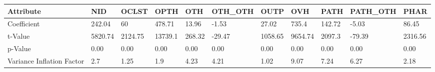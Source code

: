 \begin{tabular}{lllllllllll}
\toprule
Attribute &      NID &    OCLST &     OPTH &     OTH & OTH\_OTH &     OUTP &      OVH &    PATH & PATH\_OTH &     PHAR \\
\midrule
Coefficient               &   242.04 &       60 &   478.71 &   13.96 &   -1.53 &    27.02 &    735.4 &  142.72 &    -5.03 &    86.45 \\
t-Value                   &  5820.74 &  2124.75 &  13739.1 &  268.32 &  -29.47 &  1058.65 &  9654.74 &  2097.3 &   -79.39 &  2316.56 \\
p-Value                   &     0.00 &     0.00 &     0.00 &    0.00 &    0.00 &     0.00 &     0.00 &    0.00 &     0.00 &     0.00 \\
Variance Inflation Factor &      2.7 &     1.25 &      1.9 &    4.23 &    4.21 &     1.02 &     9.07 &    7.24 &     6.27 &     2.18 \\
\bottomrule
\end{tabular}
